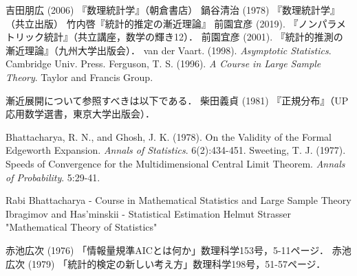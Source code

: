 \documentclass[uplatex,dvipdfmx]{jsreport}
\begin{document}

\begin{thebibliography}{99}
    吉田朋広 (2006) 『数理統計学』（朝倉書店）
    鍋谷清治 (1978) 『数理統計学』（共立出版）
    竹内啓『統計的推定の漸近理論』
    前園宜彦 (2019). 『ノンパラメトリック統計』（共立講座，数学の輝き12）．
    前園宜彦 (2001). 『統計的推測の漸近理論』（九州大学出版会）．
    van der Vaart. (1998). \textit{Asymptotic Statistics}. Cambridge Univ. Press.
    Ferguson, T. S. (1996). \textit{A Course in Large Sample Theory}. Taylor and Francis Group.

    漸近展開について参照すべきは以下である．
    柴田義貞 (1981) 『正規分布』（UP応用数学選書，東京大学出版会）．

    Bhattacharya, R. N., and Ghosh, J. K. (1978). On the Validity of the Formal Edgeworth Expansion. \textit{Annals of Statistics}. 6(2):434-451.
    Sweeting, T. J. (1977). Speeds of Convergence for the Multidimensional Central Limit Theorem. \textit{Annals of Probability}. 5:29-41.

    Rabi Bhattacharya - Course in Mathematical Statistics and Large Sample Theory
    Ibragimov and Has'minskii - Statistical Estimation
    Helmut Strasser "Mathematical Theory of Statistics"

    赤池広次 (1976) 「情報量規準AICとは何か」数理科学153号，5-11ページ．
    赤池広次 (1979) 「統計的検定の新しい考え方」数理科学198号，51-57ページ．
\end{thebibliography}
\end{document}
